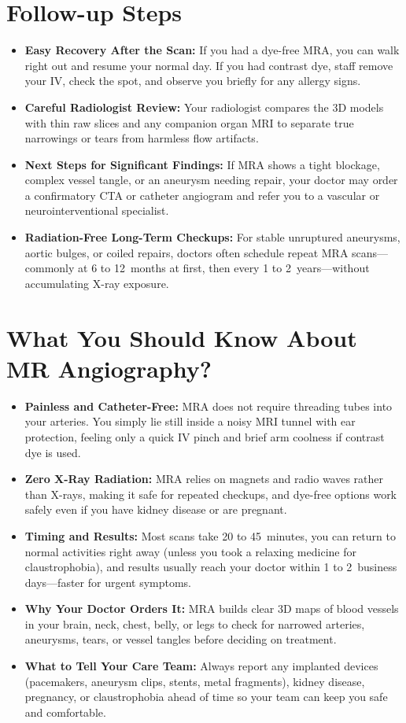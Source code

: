 \section{Follow-up Steps}
\begin{itemize}
\item \textbf{Easy Recovery After the Scan:} If you had a dye-free MRA, you can walk right out and resume your normal day. If you had contrast dye, staff remove your IV, check the spot, and observe you briefly for any allergy signs.
\item \textbf{Careful Radiologist Review:} Your radiologist compares the 3D models with thin raw slices and any companion organ MRI to separate true narrowings or tears from harmless flow artifacts.
\item \textbf{Next Steps for Significant Findings:} If MRA shows a tight blockage, complex vessel tangle, or an aneurysm needing repair, your doctor may order a confirmatory CTA or catheter angiogram and refer you to a vascular or neurointerventional specialist.
\item \textbf{Radiation-Free Long-Term Checkups:} For stable unruptured aneurysms, aortic bulges, or coiled repairs, doctors often schedule repeat MRA scans---commonly at 6 to 12~months at first, then every 1 to 2~years---without accumulating X-ray exposure.
\end{itemize}

\section{What You Should Know About MR Angiography?}
\begin{itemize}
\item \textbf{Painless and Catheter-Free:} MRA does not require threading tubes into your arteries. You simply lie still inside a noisy MRI tunnel with ear protection, feeling only a quick IV pinch and brief arm coolness if contrast dye is used.
\item \textbf{Zero X-Ray Radiation:} MRA relies on magnets and radio waves rather than X-rays, making it safe for repeated checkups, and dye-free options work safely even if you have kidney disease or are pregnant.
\item \textbf{Timing and Results:} Most scans take 20 to 45~minutes, you can return to normal activities right away (unless you took a relaxing medicine for claustrophobia), and results usually reach your doctor within 1 to 2~business days---faster for urgent symptoms.
\item \textbf{Why Your Doctor Orders It:} MRA builds clear 3D maps of blood vessels in your brain, neck, chest, belly, or legs to check for narrowed arteries, aneurysms, tears, or vessel tangles before deciding on treatment.
\item \textbf{What to Tell Your Care Team:} Always report any implanted devices (pacemakers, aneurysm clips, stents, metal fragments), kidney disease, pregnancy, or claustrophobia ahead of time so your team can keep you safe and comfortable.
\end{itemize}

